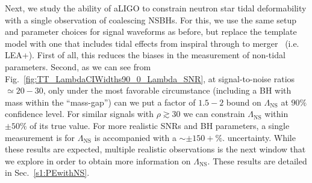 \documentclass[aps,prd,amsmath,floats,floatfix, twocolumn,
superscriptaddress,nofootinbib,showpacs]{revtex4-1}
\newcommand{\lambdans}{\Lambda_\mathrm{NS}}
\begin{document}
Next, we study the ability of aLIGO to constrain neutron star tidal 
deformability with a single observation of coalescing NSBHs. For this, we
use the same setup and parameter choices for signal waveforms as before, but
replace the template model with one that includes tidal effects from inspiral
through to merger~\cite{Lackey:2013axa} (i.e. LEA+). First of all, this reduces
the biases in the measurement of non-tidal parameters. Second, as we can see
from Fig.~\ref{fig:TT_LambdaCIWidths90_0_Lambda_SNR}, at signal-to-noise
ratios $\simeq 20-30$, only under the most favorable circumstance (including a
BH with mass within the ``mass-gap'') can we put a factor of $1.5-2$ bound on
$\lambdans$ at $90\%$ confidence level. For similar signals with 
$\rho\gtrsim 30$ we can constrain $\lambdans$ within $\pm 50\%$ of its true
value. For more realistic SNRs and BH parameters, a single measurement is 
for $\lambdans$ is accompanied with a $\sim\pm150+\%$. uncertainty. While these
results are expected, multiple realistic observations is the next window that 
we explore in order to obtain more information on $\lambdans$. These results 
are detailed in Sec.~\ref{s1:PEwithNS}.
\end{document}
